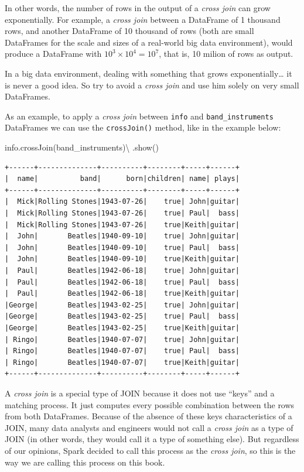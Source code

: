 \documentclass[
  11pt,
  letterpaper,
  DIV=11,
  numbers=noendperiod]{scrreprt}
\newenvironment{Shaded}{\begin{snugshade}}{\end{snugshade}}
\newcommand{\NormalTok}[1]{\textcolor[rgb]{0.00,0.23,0.31}{#1}}
\newcommand{\OperatorTok}[1]{\textcolor[rgb]{0.37,0.37,0.37}{#1}}
\begin{document}
In other words, the number of rows in the output of a \emph{cross join}
can grow exponentially. For example, a \emph{cross join} between a
DataFrame of 1 thousand rows, and another DataFrame of 10 thousand of
rows (both are small DataFrames for the scale and sizes of a real-world
big data environment), would produce a DataFrame with
\(10^3 \times 10^4 = 10^7\), that is, 10 milion of rows as output.

In a big data environment, dealing with something that grows
exponentially\ldots{} it is never a good idea. So try to avoid a
\emph{cross join} and use him solely on very small DataFrames.

As an example, to apply a \emph{cross join} between \texttt{info} and
\texttt{band\_instruments} DataFrames we can use the
\texttt{crossJoin()} method, like in the example below:

\begin{Shaded}
\begin{Highlighting}[]
\NormalTok{info.crossJoin(band\_instruments)}\OperatorTok{\textbackslash{}}
\NormalTok{    .show()}
\end{Highlighting}
\end{Shaded}


\begin{verbatim}
+------+--------------+----------+--------+-----+------+
|  name|          band|      born|children| name| plays|
+------+--------------+----------+--------+-----+------+
|  Mick|Rolling Stones|1943-07-26|    true| John|guitar|
|  Mick|Rolling Stones|1943-07-26|    true| Paul|  bass|
|  Mick|Rolling Stones|1943-07-26|    true|Keith|guitar|
|  John|       Beatles|1940-09-10|    true| John|guitar|
|  John|       Beatles|1940-09-10|    true| Paul|  bass|
|  John|       Beatles|1940-09-10|    true|Keith|guitar|
|  Paul|       Beatles|1942-06-18|    true| John|guitar|
|  Paul|       Beatles|1942-06-18|    true| Paul|  bass|
|  Paul|       Beatles|1942-06-18|    true|Keith|guitar|
|George|       Beatles|1943-02-25|    true| John|guitar|
|George|       Beatles|1943-02-25|    true| Paul|  bass|
|George|       Beatles|1943-02-25|    true|Keith|guitar|
| Ringo|       Beatles|1940-07-07|    true| John|guitar|
| Ringo|       Beatles|1940-07-07|    true| Paul|  bass|
| Ringo|       Beatles|1940-07-07|    true|Keith|guitar|
+------+--------------+----------+--------+-----+------+
\end{verbatim}

A \emph{cross join} is a special type of JOIN because it does not use
``keys'' and a matching process. It just computes every possible
combination between the rows from both DataFrames. Because of the
absence of these keys characteristics of a JOIN, many data analysts and
engineers would not call a \emph{cross join} as a type of JOIN (in other
words, they would call it a type of something else). But regardless of
our opinions, Spark decided to call this process as the \emph{cross
join}, so this is the way we are calling this process on this book.
\end{document}
